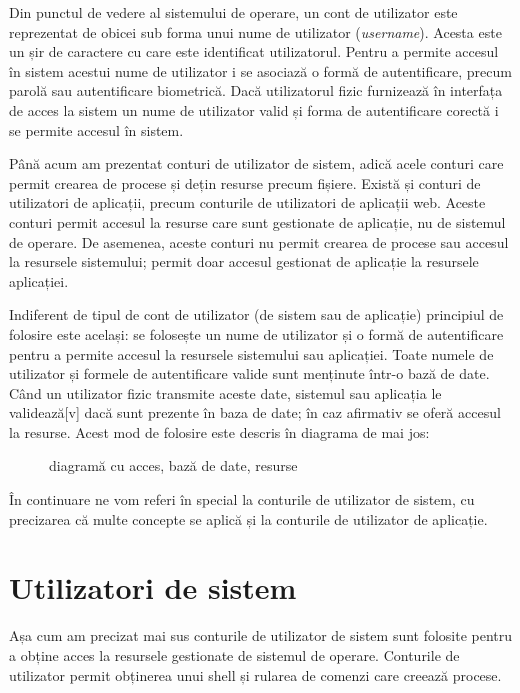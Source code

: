 Din punctul de vedere al sistemului de operare, un cont de utilizator este
reprezentat de obicei sub forma unui nume de utilizator (\textit{username}).
Acesta este un șir de caractere cu care este identificat utilizatorul. Pentru a
permite accesul în sistem acestui nume de utilizator i se asociază o formă de
autentificare, precum parolă sau autentificare biometrică. Dacă utilizatorul
fizic furnizează în interfața de acces la sistem un nume de utilizator valid și
forma de autentificare corectă i se permite accesul în sistem.

Până acum am prezentat conturi de utilizator de sistem, adică acele conturi care
permit crearea de procese și dețin resurse precum fișiere. Există și conturi de
utilizatori de aplicații, precum conturile de utilizatori de aplicații web.
Aceste conturi permit accesul la resurse care sunt gestionate de aplicație, nu
de sistemul de operare. De asemenea, aceste conturi nu permit crearea de procese
sau accesul la resursele sistemului; permit doar accesul gestionat de aplicație
la resursele aplicației.

Indiferent de tipul de cont de utilizator (de sistem sau de aplicație)
principiul de folosire este același: se folosește un nume de utilizator și o
formă de autentificare pentru a permite accesul la resursele sistemului sau
aplicației. Toate numele de utilizator și formele de autentificare valide sunt
menținute într-o bază de date. Când un utilizator fizic transmite aceste date,
sistemul sau aplicația le validează[v] dacă sunt prezente în baza de date; în
caz afirmativ se oferă accesul la resurse. Acest mod de folosire este descris în
diagrama de mai jos:

\begin{figure}[htbp]
	\centering
	\def\svgwidth{\columnwidth}
	
	\caption{diagramă cu acces, bază de date, resurse}
	\label{fig:user-acces-bd}
\end{figure}

În continuare ne vom referi în special la conturile de utilizator de sistem, cu
precizarea că multe concepte se aplică și la conturile de utilizator de
aplicație.

\section{Utilizatori de sistem}
\label{sec:users-sistem}

Așa cum am precizat mai sus conturile de utilizator de sistem sunt folosite
pentru a obține acces la resursele gestionate de sistemul de operare. Conturile
de utilizator permit obținerea unui shell și rularea de comenzi care creează
procese.


